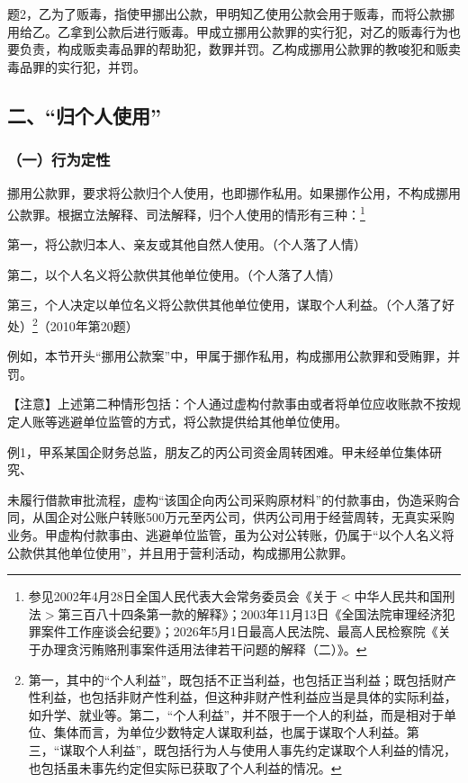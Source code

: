 题2，乙为了贩毒，指使甲挪出公款，甲明知乙使用公款会用于贩毒，而将公款挪用给乙。乙拿到公款后进行贩毒。甲成立挪用公款罪的实行犯，对乙的贩毒行为也要负责，构成贩卖毒品罪的帮助犯，数罪并罚。乙构成挪用公款罪的教唆犯和贩卖毒品罪的实行犯，并罚。

\subsection*{二、“归个人使用”}

\subsubsection*{（一）行为定性}

挪用公款罪，要求将公款归个人使用，也即挪作私用。如果挪作公用，不构成挪用公款罪。根据立法解释、司法解释，归个人使用的情形有三种：\footnote{参见2002年4月28日全国人民代表大会常务委员会《关于\ensuremath{<}中华人民共和国刑法\ensuremath{>}第三百八十四条第一款的解释》；2003年11月13日《全国法院审理经济犯罪案件工作座谈会纪要》；2026年5月1日最高人民法院、最高人民检察院《关于办理贪污贿赂刑事案件适用法律若干问题的解释（二）》。}

第一，将公款归本人、亲友或其他自然人使用。（个人落了人情）

第二，以个人名义将公款供其他单位使用。（个人落了人情）

第三，个人决定以单位名义将公款供其他单位使用，谋取个人利益。（个人落了好处）\footnote{第一，其中的“个人利益”，既包括不正当利益，也包括正当利益；既包括财产性利益，也包括非财产性利益，但这种非财产性利益应当是具体的实际利益，如升学、就业等。第二，“个人利益”，并不限于一个人的利益，而是相对于单位、集体而言，为单位少数特定人谋取利益，也属于谋取个人利益。第三，“谋取个人利益”，既包括行为人与使用人事先约定谋取个人利益的情况，也包括虽未事先约定但实际已获取了个人利益的情况。}（2010年第20题）

例如，本节开头“挪用公款案”中，甲属于挪作私用，构成挪用公款罪和受贿罪，并罚。

【注意】上述第二种情形包括：个人通过虚构付款事由或者将单位应收账款不按规定人账等逃避单位监管的方式，将公款提供给其他单位使用。

例1，甲系某国企财务总监，朋友乙的丙公司资金周转困难。甲未经单位集体研究、

未履行借款审批流程，虚构“该国企向丙公司采购原材料”的付款事由，伪造采购合同，从国企对公账户转账500万元至丙公司，供丙公司用于经营周转，无真实采购业务。甲虚构付款事由、逃避单位监管，虽为公对公转账，仍属于“以个人名义将公款供其他单位使用”，并且用于营利活动，构成挪用公款罪。

